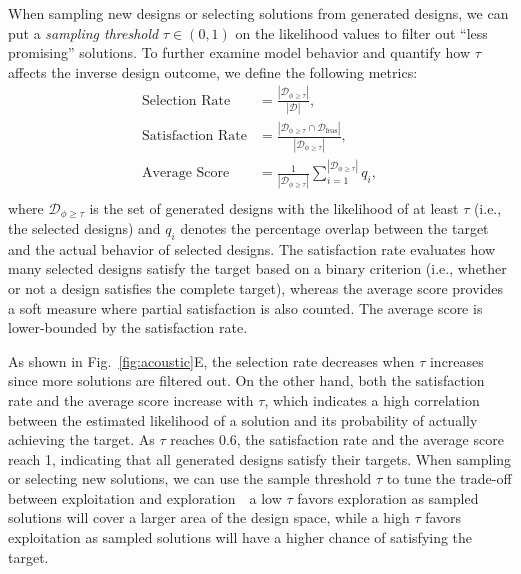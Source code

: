 \documentclass{article}
\begin{document}
When sampling new designs or selecting solutions from generated designs, we can put a \textit{sampling threshold} $\tau \in (0, 1)$ on the likelihood values to filter out ``less promising'' solutions. To further examine model behavior and quantify how $\tau$ affects the inverse design outcome, we define the following metrics:
\begin{equation}
\begin{split}
\text{Selection Rate} & = \frac{|\mathcal{D}_{\phi \geq \tau}|}{|\mathcal{D}|}, \\
\text{Satisfaction Rate} & = \frac{|\mathcal{D}_{\phi \geq \tau} \cap \mathcal{D}_\text{feas}|}{|\mathcal{D}_{\phi \geq \tau}|}, \\
\text{Average Score} & = \frac{1}{|\mathcal{D}_{\phi \geq \tau}|} \sum_{i=1}^{|\mathcal{D}_{\phi \geq \tau}|} q_i, \\
\end{split}
\label{eq:metrics}
\end{equation}
where $\mathcal{D}_{\phi \geq \tau}$ is the set of generated designs with the likelihood of at least $\tau$ (i.e., the selected designs) and $q_i$ denotes the percentage overlap between the target and the actual behavior of selected designs.
The satisfaction rate evaluates how many selected designs satisfy the target based on a binary criterion (i.e., whether or not a design satisfies the complete target), whereas the average score provides a soft measure where partial satisfaction is also counted. The average score is lower-bounded by the satisfaction rate.

As shown in Fig.~\ref{fig:acoustic}E, the selection rate decreases when $\tau$ increases since more solutions are filtered out. On the other hand, both the satisfaction rate and the average score increase with $\tau$, which indicates a high correlation between the estimated likelihood of a solution and its probability of actually achieving the target. As $\tau$ reaches 0.6, the satisfaction rate and the average score reach 1, indicating that all generated designs satisfy their targets. When sampling or selecting new solutions, we can use the sample threshold $\tau$ to tune the trade-off between exploitation and exploration~\textemdash~a low $\tau$ favors exploration as sampled solutions will cover a larger area of the design space, while a high $\tau$ favors exploitation as sampled solutions will have a higher chance of satisfying the target.
\end{document}
